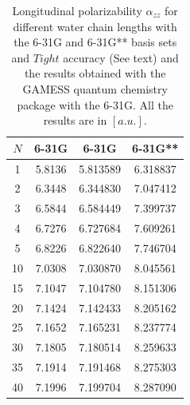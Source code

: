 \documentclass[twocolumn,showpacs,preprintnumbers,amsmath,amssymb]{revtex4}
\begin{document}
\begin{table}
  \centering
  \caption{\protect
    Longitudinal polarizability $\alpha_{zz}$
    for different water chain lengths with the 6-31G and 6-31G** basis sets
    and $Tight$ accuracy (See text) and the results obtained with
    the GAMESS quantum chemistry package \cite{gamess} with the 6-31G. 
    All the results are in $[a.u.]$.
  }\label{tab:Alpha_1D_Values}
  \begin{ruledtabular}
    \begin{tabular}{cccc}
      $N$ &\multicolumn{1}{c}{6-31G\footnotemark[1]}
      &\multicolumn{1}{c}{6-31G\footnotemark[2]}
      &\multicolumn{1}{c}{6-31G**\footnotemark[2]}\\
      \hline
      1 & 5.8136 & 5.813589 & 6.318837     \\
      2 & 6.3448 & 6.344830 & 7.047412     \\
      3 & 6.5844 & 6.584449 & 7.399737     \\
      4 & 6.7276 & 6.727684 & 7.609261     \\
      5 & 6.8226 & 6.822640 & 7.746704     \\
     10 & 7.0308 & 7.030870 & 8.045561     \\
     15 & 7.1047 & 7.104780 & 8.151306     \\
     20 & 7.1424 & 7.142433 & 8.205162     \\
     25 & 7.1652 & 7.165231 & 8.237774     \\
     30 & 7.1805 & 7.180514 & 8.259633     \\
     35 & 7.1914 & 7.191468 & 8.275303     \\
     40 & 7.1996 & 7.199704 & 8.287090     \\
    \end{tabular}
  \end{ruledtabular}
\end{table}
\end{document}
